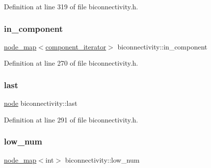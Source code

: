 Definition at line 319 of file biconnectivity.\+h.

\mbox{\label{classbiconnectivity_a487da69817fa89ab3d1523ad9846ae8e}} 
\subsubsection{\texorpdfstring{in\+\_\+component}{in\_component}}
{\footnotesize\ttfamily \mbox{\hyperlink{classnode__map}{node\+\_\+map}}$<$\mbox{\hyperlink{classbiconnectivity_aef69aa0c23bfcd945e385350154b6483}{component\+\_\+iterator}}$>$ biconnectivity\+::in\+\_\+component\hspace{0.3cm}{\ttfamily [protected]}}



Definition at line 270 of file biconnectivity.\+h.

\mbox{\label{classbiconnectivity_a6f2e474efeb8ccb023d9b84385798193}} 
\subsubsection{\texorpdfstring{last}{last}}
{\footnotesize\ttfamily \mbox{\hyperlink{classnode}{node}} biconnectivity\+::last\hspace{0.3cm}{\ttfamily [protected]}}



Definition at line 291 of file biconnectivity.\+h.

\mbox{\label{classbiconnectivity_ac5817e2122477ed591ef229c081745f3}} 
\subsubsection{\texorpdfstring{low\+\_\+num}{low\_num}}
{\footnotesize\ttfamily \mbox{\hyperlink{classnode__map}{node\+\_\+map}}$<$int$>$ biconnectivity\+::low\+\_\+num\hspace{0.3cm}{\ttfamily [protected]}}



